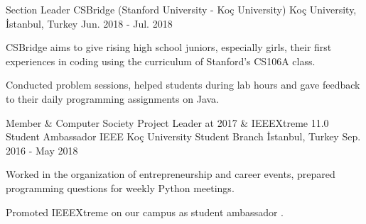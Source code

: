 
\vspace*{-1.5mm}

\begin{cventries}


    \cventry
    {Section Leader}%
    {CSBridge (Stanford University - Koç University)}%
    {Koç University, İstanbul, Turkey}
    {Jun. 2018 - Jul. 2018}
    {
      \begin{cvitems}
        \item {CSBridge aims to give rising high school juniors, especially girls, their first experiences in coding using the curriculum of Stanford's CS106A class.} 	             
        \item{Conducted problem sessions, helped students during lab hours and gave feedback to their daily programming assignments on Java.}
      \end{cvitems}
    }

  \cventry
    {Member \& Computer Society Project Leader at 2017 \& IEEEXtreme 11.0 Student Ambassador}
    {IEEE Koç University Student Branch}
    {İstanbul, Turkey}
    {Sep. 2016 - May 2018}
    {
      \begin{cvitems}
        \item {Worked in the organization of entrepreneurship and career events, prepared programming questions for weekly Python meetings.}
        \item {Promoted IEEEXtreme on our campus as student ambassador .}
      \end{cvitems}
    }

\end{cventries}
